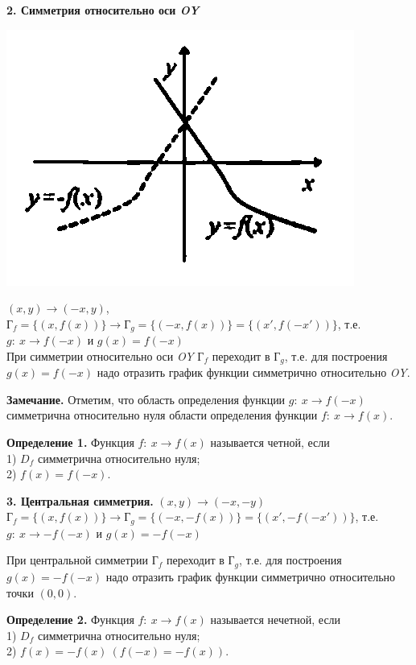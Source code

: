 \documentclass{article}
\begin{document}
    \textbf{2. Симметрия относительно оси \textit{OY}}

    \noindent\begin{minipage}{0.3\textwidth}
        \includegraphics[scale=0.3]{4_6}
    \end{minipage}
    \hfill%
    \begin{minipage}{0.6\textwidth}\raggedright
        $(x, y) \rightarrow (-x, y)$,\\
        $\textrm{Г}_f = \{(x, f(x))\} \rightarrow \textrm{Г}_g = \{(-x, f(x))\} = \{(x', f(-x'))\}$, т.е.\\
        $g:\ x \rightarrow f(-x)$ и $g(x) = f(-x)$\\
        При симметрии относительно оси \textit{OY} $\textrm{Г}_f$ переходит в $\textrm{Г}_g$, т.е. для построения $g(x) = f(-x)$ надо отразить график функции симметрично относительно \textit{OY}.
    \end{minipage}

    \textbf{Замечание.} Отметим, что область определения функции $g:\ x \rightarrow f(-x)$ симметрична относительно нуля области определения функции $f:\ x \rightarrow f(x)$.
    
    \textbf{Определение 1.} Функция $f:\ x \rightarrow f(x)$ называется четной, если\\
    1)	$D_f$ симметрична относительно нуля;\\
    2)	$f(x) = f(-x)$.

    \textbf{3. Центральная симметрия.}
    $(x, y) \rightarrow (-x, -y)$\\
    $\textrm{Г}_f = \{(x, f(x))\} \rightarrow \textrm{Г}_g = \{(-x, -f(x))\} = \{(x', -f(-x'))\}$, т.е. $g:\ x \rightarrow -f(-x)$ и $g(x) = -f(-x)$

    При центральной симметрии $\textrm{Г}_f$ переходит в $\textrm{Г}_g$, т.е. для построения $g(x) = -f(-x)$ надо отразить график функции симметрично относительно точки $(0, 0)$.

    \textbf{Определение 2.} Функция $f:\ x \rightarrow f(x)$ называется нечетной, если\\
    1)	$D_f$ симметрична относительно нуля;\\
    2)	$f(x) = -f(x)\ (f(-x) = -f(x))$.

\end{document}

